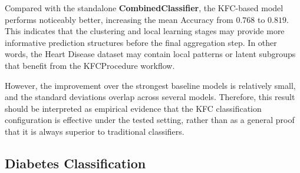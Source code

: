 Compared with the standalone \textbf{CombinedClassifier}, the KFC-based model performs noticeably better, increasing the mean Accuracy from $0.768$ to $0.819$. This indicates that the clustering and local learning stages may provide more informative prediction structures before the final aggregation step. In other words, the Heart Disease dataset may contain local patterns or latent subgroups that benefit from the KFCProcedure workflow.

However, the improvement over the strongest baseline models is relatively small, and the standard deviations overlap across several models. Therefore, this result should be interpreted as empirical evidence that the KFC classification configuration is effective under the tested setting, rather than as a general proof that it is always superior to traditional classifiers.

\subsection{Diabetes Classification}

\begin{table}[H]
    \centering
    \caption{Mean Diabetes Classification Results}
    \label{tab:diabetes_aggregated_results}
    \small
\end{table}

